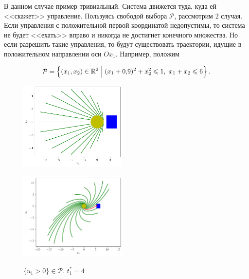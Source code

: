 \documentclass[12pt, a4paper]{article} %
\renewcommand{\le}{\leqslant}
\newcommand{\Real}{\mathbb{R}}
\begin{document}
В данном случае пример тривиальный.
Система движется туда, куда ей <<скажет>> управление.
Пользуясь свободой выбора $\mathcal{P}$, рассмотрим 2 случая.
Если управления с положительной первой координатой недопустимы, то 
система не будет <<ехать>> вправо и никогда не достигнет конечного множества.
Но если разрешить такие управления, то будут существовать траектории, 
идущие в положительном направлении оси  $Ox_1$.
Например, положим 

\[
    \mathcal{P} = \left\{ (x_1, x_2) \in \Real^2 \Bigm| 
        (x_1 + 0{,}9)^2 + x_2^2 \le 1,\
    x_1 + x_2 \le 6\right\}
.\] 

\begin{figure}[H]
    \begin{multicols}{2}
        \begin{centering}
            \includegraphics[width=0.48\textwidth]{figures/ex41_x.pdf}
            \label{fig:ex31_x}
            \caption{$\{u_1 > 0\} \notin \mathcal{P}$. $t_1^{*} = \infty$}
            \hfill 
            \includegraphics[width=0.48\textwidth]{figures/ex42_x.pdf}
            \label{fig:ex32_x}
            \caption{$\{u_1 > 0\} \in \mathcal{P}$. $t_1^{*} = 4$}
        \end{centering} 
    \end{multicols}
\end{figure} 



\end{document}
